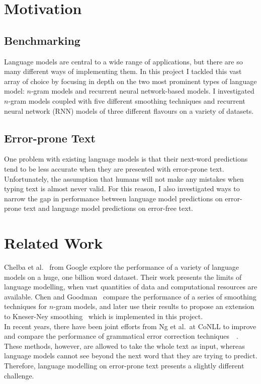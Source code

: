 \documentclass[a4paper, 12pt]{report}
\begin{document}
\section{Motivation}

\subsection*{Benchmarking}

Language models are central to a wide range of applications, but there are so many different ways of implementing them. In this project I tackled this vast array of choice by focusing in depth on the two most prominent types of language model: $n$-gram models and recurrent neural network-based models. I investigated $n$-gram models coupled with five different smoothing techniques and recurrent neural network (RNN) models of three different flavours on a variety of datasets.

\subsection*{Error-prone Text}

One problem with existing language models is that their next-word predictions tend to be less accurate when they are presented with error-prone text. Unfortunately, the assumption that humans will not make any mistakes when typing text is almost never valid.  For this reason, I also investigated ways to narrow the gap in performance between language model predictions on error-prone text and language model predictions on error-free text. 

\section{Related Work}

Chelba et al.~\cite{1bw:chelba2013} from Google explore the performance of a variety of language models on a huge, one billion word dataset. Their work presents the limits of language modelling, when vast quantities of data and computational resources are available. Chen and Goodman~\cite{smoothing:chen1996} compare the performance of a series of smoothing techniques for $n$-gram models, and later use their results to propose an extension to Kneser-Ney smoothing~\cite{modified_kneser_ney:chen1999} which is implemented in this project. \\

In recent years, there have been joint efforts from Ng et al.\ at CoNLL to improve and compare the performance of grammatical error correction techniques~\cite{error_correction2013:ng2013}~\cite{error_correction2014:ng2014}. These methods, however, are allowed to take the whole text as input, whereas language models cannot see beyond the next word that they are trying to predict. Therefore, language modelling on error-prone text presents a slightly different challenge.
\end{document}
